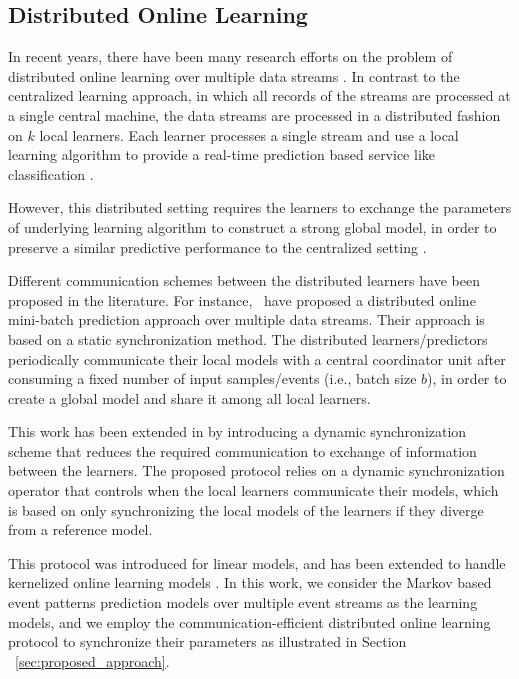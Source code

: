 
\subsection{Distributed Online Learning}

\par In recent years, there have been many research efforts on the problem of distributed online learning over multiple data streams \cite{tekin2014distributed,yan2013distributed,canzian2015ensemble,zhang2014fast,dekel2012optimal,kamp2014communication}.   In contrast to the centralized learning approach, in which all records of the streams are processed at a single central machine, the data streams are processed in a distributed fashion on $k$ local learners. Each learner processes a single stream and use a local learning algorithm to provide a real-time prediction based service like classification \cite{canzian2015ensemble}.  

\par However, this distributed setting requires the learners to exchange the parameters of underlying learning algorithm to construct a strong global model, in order to preserve a similar predictive performance to the centralized setting \cite{kamp2014communication}. 

\par Different communication schemes between the distributed learners have been proposed in the literature. For instance,~\citet{dekel2012optimal} have proposed a distributed online mini-batch prediction approach over multiple data streams. Their approach is based on a static synchronization method. The distributed learners/predictors periodically communicate  their local models with a central coordinator unit after consuming a fixed number of input samples/events (i.e., batch size $b$), in order to create a global model  and share it among all local learners. 

\par This work has been extended in \cite{kamp2014communication} by introducing a dynamic synchronization scheme that reduces the required communication to exchange of information between the learners. The proposed protocol relies on a dynamic synchronization operator that controls when the local learners communicate their models, which is based on only synchronizing the local models of the learners if they diverge from a reference model. 
 
\par This protocol was introduced for linear models, and has been extended to handle kernelized online learning models \cite{kamp2016communication}. In this work, we consider the Markov based event patterns prediction models \cite{alevizos2017event} over multiple event streams as the learning models, and we employ the communication-efficient distributed online learning protocol \cite{kamp2014communication} to synchronize their parameters as illustrated in Section ~\ref{sec:proposed_approach}. 
